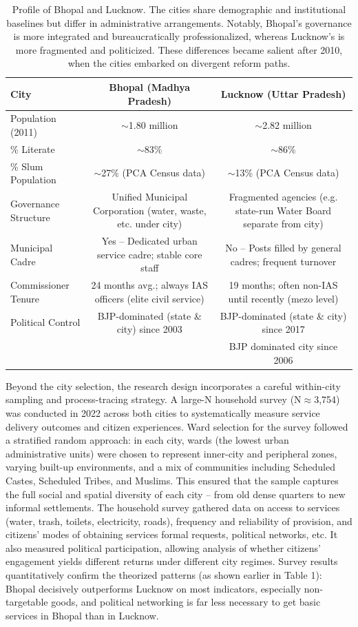 \begin{table}[htbp]
\centering
\caption{Profile of Bhopal and Lucknow. The cities share demographic and institutional baselines but differ in administrative arrangements. Notably, Bhopal's governance is more integrated and bureaucratically professionalized, whereas Lucknow's is more fragmented and politicized. These differences became salient after 2010, when the cities embarked on divergent reform paths.}
\begin{tabular}{lcc}
\hline
\textbf{City} & \textbf{Bhopal (Madhya Pradesh)} & \textbf{Lucknow (Uttar Pradesh)} \\
\hline
Population (2011) & $\sim$1.80 million & $\sim$2.82 million \\
\hline
\% Literate & $\sim$83\% & $\sim$86\% \\
\hline
\% Slum Population & $\sim$27\% (PCA Census data) & $\sim$13\% (PCA Census data) \\
\hline
Governance Structure & Unified Municipal Corporation (water, waste, etc. under city) & Fragmented agencies (e.g. state-run Water Board separate from city) \\
\hline
Municipal Cadre & Yes – Dedicated urban service cadre; stable core staff & No – Posts filled by general cadres; frequent turnover \\
\hline
Commissioner Tenure & 24 months avg.; always IAS officers (elite civil service) & 19 months; often non-IAS until recently (mezo level) \\
\hline
Political Control & BJP-dominated (state \& city) since 2003 & BJP-dominated (state \& city) since 2017 \\
 & & BJP dominated city since 2006 \\
\hline
\end{tabular}
\label{tab:profile}
\end{table}

Beyond the city selection, the research design incorporates a careful within-city sampling and process-tracing strategy. A large-N household survey (N$\approx$3,754) was conducted in 2022 across both cities to systematically measure service delivery outcomes and citizen experiences. Ward selection for the survey followed a stratified random approach: in each city, wards (the lowest urban administrative units) were chosen to represent inner-city and peripheral zones, varying built-up environments, and a mix of communities including Scheduled Castes, Scheduled Tribes, and Muslims. This ensured that the sample captures the full social and spatial diversity of each city – from old dense quarters to new informal settlements. The household survey gathered data on access to services (water, trash, toilets, electricity, roads), frequency and reliability of provision, and citizens' modes of obtaining services formal requests, political networks, etc. It also measured political participation, allowing analysis of whether citizens' engagement yields different returns under different city regimes. Survey results quantitatively confirm the theorized patterns (as shown earlier in Table 1): Bhopal decisively outperforms Lucknow on most indicators, especially non-targetable goods, and political networking is far less necessary to get basic services in Bhopal than in Lucknow.

